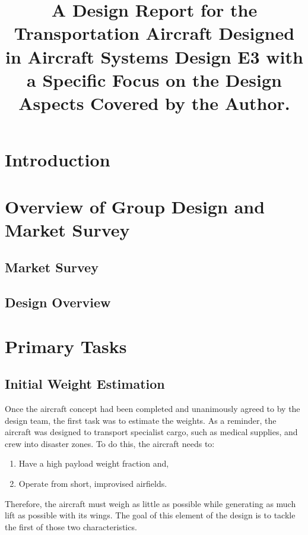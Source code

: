 \documentclass[stu, a4paper, 12pt, floatsintext]{apa7}
\title{A Design Report for the Transportation Aircraft Designed in Aircraft Systems Design E3 with a Specific Focus on the Design Aspects Covered by the Author.}
\numberwithin{figure}{section}
\numberwithin{table}{section}
\numberwithin{equation}{section}
\begin{document}
\maketitle{} %

\tableofcontents

\newpage

\listoffigures
{}
\listoftables
{}
\listofmyequations

\newpage

\section{Introduction}
\section{Overview of Group Design and Market Survey}
\subsection{Market Survey}
\subsection{Design Overview}
\section{Primary Tasks}
\subsection{Initial Weight Estimation}
Once the aircraft concept had been completed and unanimously agreed to by the design team, the first task was to estimate the weights. As a reminder, the aircraft was designed to transport specialist cargo, such as medical supplies, and crew into disaster zones. To do this, the aircraft needs to:
\begin{enumerate}
    \item Have a high payload weight fraction and, 
    \item Operate from short, improvised airfields.
\end{enumerate}

Therefore, the aircraft must weigh as little as possible while generating as much lift as possible with its wings. The goal of this element of the design is to tackle the first of those two characteristics. 
\end{document}
